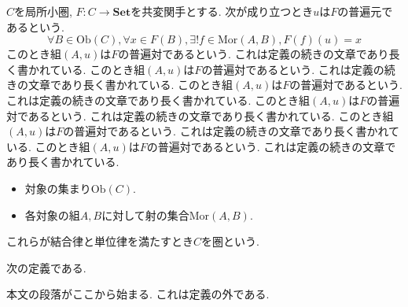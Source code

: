 \documentclass{jlreq}
\begin{document}
\begin{definition}\label{split}
$C$を局所小圏, $F \colon C \to \mathbf{Set}$を共変関手とする. 次が成り立つとき$u$は$F$の普遍元であるという.
\[ \forall B \in \mathrm{Ob}(C), \forall x \in F(B), \exists! f \in \mathrm{Mor}(A, B), F(f)(u) = x \tag{$\ast$} \]
このとき組$(A,u)$は$F$の普遍対であるという. これは定義の続きの文章であり長く書かれている. このとき組$(A,u)$は$F$の普遍対であるという. これは定義の続きの文章であり長く書かれている. このとき組$(A,u)$は$F$の普遍対であるという. これは定義の続きの文章であり長く書かれている. このとき組$(A,u)$は$F$の普遍対であるという. これは定義の続きの文章であり長く書かれている. このとき組$(A,u)$は$F$の普遍対であるという. これは定義の続きの文章であり長く書かれている. このとき組$(A,u)$は$F$の普遍対であるという. これは定義の続きの文章であり長く書かれている. 
\begin{itemize}
\item 対象の集まり$\mathrm{Ob}(C)$.
\item 各対象の組$A, B$に対して射の集合$\mathrm{Mor}(A,B)$.
\end{itemize}
これらが結合律と単位律を満たすとき$C$を圏という.
\end{definition}
\begin{definition}\label{after}
次の定義である.
\end{definition}
本文の段落がここから始まる. これは定義の外である.
\end{document}
